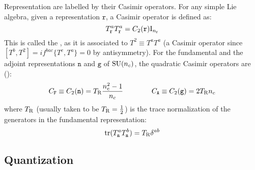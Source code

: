 Representation are labelled by their Casimir operators. For any simple Lie algebra, given a representation $ \mathtt{r} $, a Casimir operator is defined as:
\begin{equation}
  T^a_\mathtt{r} T^a_\mathtt{r} = C_2(\mathtt{r}) \mathrm{I}_{n_{\mathtt{r}}}
  \label{eq:quad-cas}
\end{equation}
This is called the , as it is associated to $ T^2 \equiv T^a T^a $ (a Casimir operator since $ [T^b, T^2] = i f^{bac} \{T^c,T^a\} = 0 $ by antisymmetry). For the fundamental and the adjoint representations $ \mathtt{n} $ and $ \mathtt{g} $ of $ \mathrm{SU}(n_c) $, the quadratic Casimir operators are ():
\begin{equation}
  C_\mathtt{F} \equiv C_2(\mathtt{n}) = T_\text{R} \frac{n_c^2 - 1}{n_c}
  \qquad \qquad
  C_\mathtt{A} \equiv C_2(\mathtt{g}) = 2T_\text{R} n_c
  \label{eq:cas-sun}
\end{equation}
where $ T_\text{R} $ (usually taken to be $ T_\text{R} = \frac{1}{2} $) is the trace normalization of the generators in the fundamental representation:
\begin{equation}
  \operatorname{tr} (T^a_\mathtt{n} T^b_\mathtt{n}) = T_\text{R} \delta^{ab}
  \label{eq:diag-norm}
\end{equation}

\subsection{Quantization}
\label{ssec:qcd-quant}

